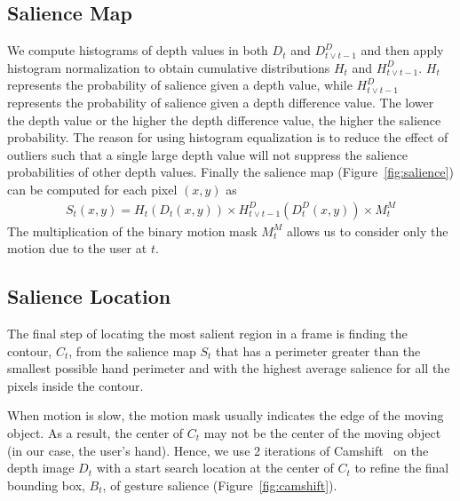 \documentclass{sigchi}
\begin{document}
\subsection{Salience Map}
We compute histograms of depth values in both $D_t$ and $D_{t\vee t-1}^{D}$ and then apply histogram normalization to obtain cumulative distributions $H_t$ and $H_{t\vee t-1}^D$.
$H_t$ represents the probability of salience given a depth value, while $H_{t\vee t-1}^D$ represents the probability of salience given
a depth difference value. The lower the depth value or the higher the depth difference value, the higher the salience probability. The reason for using
histogram equalization is to reduce the effect of outliers such that a single large depth value will not suppress the salience probabilities of other depth values. 
Finally the salience map (Figure~\ref{fig:salience}) can be computed for each pixel $(x, y)$ as
\begin{align}
S_t(x, y) = H_t(D_t(x, y)) \times H_{t\vee t-1}^D(D_t^D(x, y)) \times M_t^M
\end{align}
The multiplication of the binary motion mask $M_t^M$ allows us to consider only the motion due to the user at $t$.
 
\subsection{Salience Location}
The final step of locating the most salient region in a frame is finding the
contour, $C_t$, from the salience map $S_t$ that has a perimeter greater than
the smallest possible hand perimeter and with the highest average salience for all the pixels inside the contour.

When motion is slow, the motion mask usually indicates the edge of the moving
object. As a result, the center of $C_t$ may not be the center of the moving
object (in our case, the user's hand). Hence, we use 2 iterations of Camshift~\cite{Bradski98} on the depth image $D_t$ with a start search location at the center of $C_t$ to refine
the final bounding box, $B_t$, of gesture salience (Figure~\ref{fig:camshift}).
\end{document}
